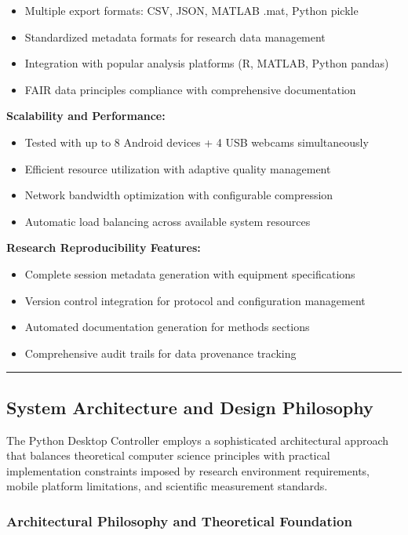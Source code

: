 \documentclass[11pt,a4paper]{article}
\begin{document}
\begin{itemize}
\item Multiple export formats: CSV, JSON, MATLAB .mat, Python pickle
\item Standardized metadata formats for research data management
\item Integration with popular analysis platforms (R, MATLAB, Python pandas)
\item FAIR data principles compliance with comprehensive documentation

\end{itemize}
\textbf{Scalability and Performance:}

\begin{itemize}
\item Tested with up to 8 Android devices + 4 USB webcams simultaneously
\item Efficient resource utilization with adaptive quality management
\item Network bandwidth optimization with configurable compression
\item Automatic load balancing across available system resources

\end{itemize}
\textbf{Research Reproducibility Features:}

\begin{itemize}
\item Complete session metadata generation with equipment specifications
\item Version control integration for protocol and configuration management
\item Automated documentation generation for methods sections
\item Comprehensive audit trails for data provenance tracking

\end{itemize}
\hrule

\subsection{System Architecture and Design Philosophy}

The Python Desktop Controller employs a sophisticated architectural approach that balances theoretical computer science
principles with practical implementation constraints imposed by research environment requirements, mobile platform
limitations, and scientific measurement standards.

\subsubsection{Architectural Philosophy and Theoretical Foundation}
\end{document}
